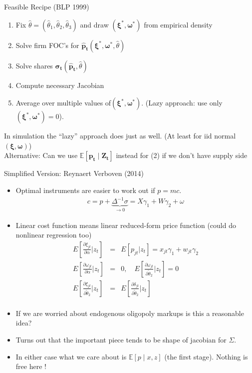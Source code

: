 \documentclass[aspectratio=169,10pt]{beamer}
\begin{document}
\begin{frame}{Feasible Recipe (BLP 1999)}
\begin{enumerate}
\item Fix $\widehat{\theta}=(\widehat{\theta}_1,\widehat{\theta}_2,\widehat{\theta}_3)$ and draw $(\symbf{\xi}^{*},\symbf{\omega}^{*})$ from empirical density
\item Solve firm FOC's for $\symbf{\hat{p}_{t}}(\symbf{\xi}^{*},\symbf{\omega}^{*},\widehat{\theta})$
\item Solve shares $\symbf{\sigma_{t}}(\symbf{\hat{p}_{t}},\widehat{\theta})$
\item Compute necessary Jacobian
\item Average over multiple values of$(\symbf{\xi}^{*},\symbf{\omega}^{*})$. (Lazy approach: use only $(\symbf{\xi}^{*},\symbf{\omega}^{*})=0$).
\end{enumerate}
In simulation the ``lazy'' approach does just as well. (At least for iid normal $(\symbf{\xi},\symbf{\omega})$)\\

 Alternative: Can we use $\mathbb{E}[ \symbf{p_t} \mid \symbf{Z_t}]$ instead for (2) if we don't have supply side
\end{frame}



\begin{frame}{Simplified Version: Reynaert Verboven (2014)}
\begin{itemize}
\footnotesize
\item Optimal instruments are easier to work out if $p = mc$.
\begin{eqnarray*}
c = p  + \underbrace{\Delta^{-1} \sigma}_{\rightarrow 0}  = X \gamma_1 + W \gamma_2 + \omega
\end{eqnarray*}
\item Linear cost function means linear reduced-form price function (could do nonlinear regression too)
\begin{eqnarray*}
E\left[ \frac{\partial \xi_{jt} }{\partial \alpha} | z_t \right] &=& E[p_{jt} | z_t] = x_{jt} \gamma_1 + w_{jt} \gamma_2\\
E\left[ \frac{\partial \omega_{jt} }{\partial \alpha} | z_t \right] &=& 0 , \quad E\left[ \frac{\partial \omega_{jt} }{\partial \widetilde{\theta}_2} | z_t \right] = 0\\
E\left[ \frac{\partial \xi_{jt} }{\partial \widetilde{\theta}_2} | z_t \right] &=&E\left[ \frac{\partial \delta_{jt} }{\partial \widetilde{\theta}_2} | z_t \right]\\
\end{eqnarray*}
\item If we are worried about endogenous oligopoly markups is this a reasonable idea?
\item Turns out that the important piece tends to be \alert{shape} of jacobian for $\Sigma$.
\item In either case what we care about is $\mathbb{E}[p \mid x, z]$ (the \alert{first stage}). Nothing is free here !
\end{itemize}
\end{frame}
\end{document}
